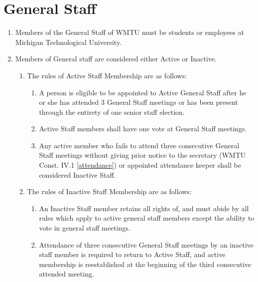 \documentclass[12pt]{constitution}
\begin{document}
\section{General Staff}
\begin{enumerate}
\item Members of the General Staff of WMTU must be students or employees at Michigan Technological University.
\item Members of General staff are considered either Active or Inactive.
\begin{enumerate}
\item The rules of Active Staff Membership are as follows:
\begin{enumerate}
\item A person is eligible to be appointed to Active General Staff after he or she has attended 3 General Staff meetings or has been present through the entirety of one senior staff election.
\item Active Staff members shall have one vote at General Staff meetings.
\item Any active member who fails to attend three consecutive General Staff meetings without giving prior notice to the secretary (WMTU Const. IV.1 \cref{attendance}) or appointed attendance keeper shall be considered Inactive Staff.
\end{enumerate}
\item The rules of Inactive Staff Membership are as follows:
\begin{enumerate}
\item An Inactive Staff member retains all rights of, and must abide by all rules which apply to active general staff members except the ability to vote in general staff meetings.
\item Attendance of three consecutive General Staff meetings by an inactive staff member is required to return to Active Staff, and active membership is re­established at the beginning of the third consecutive attended meeting.
\end{enumerate}
\end{enumerate}
\end{enumerate}
\end{document}

